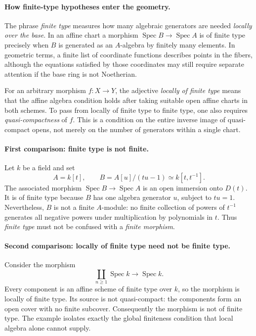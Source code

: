 \paragraph{How finite-type hypotheses enter the geometry.}
The phrase \emph{finite type} measures how many algebraic generators are needed
\emph{locally over the base}.  In an affine chart a morphism
\(\operatorname{Spec}B\to\operatorname{Spec}A\) is of finite type precisely when
\(B\) is generated as an \(A\)-algebra by finitely many elements.
In geometric terms, a finite list of coordinate functions describes points
in the fibers, although the equations satisfied by those coordinates may
still require separate attention if the base ring is not Noetherian.

For an arbitrary morphism \(f:X\to Y\), the adjective \emph{locally of finite
type} means that the affine algebra condition holds after taking suitable
open affine charts in both schemes.  To pass from locally of finite type to
finite type, one also requires \emph{quasi-compactness} of \(f\).
This is a condition on the entire inverse image of quasi-compact opens,
not merely on the number of generators within a single chart.

\paragraph{First comparison: finite type is not finite.}
Let \(k\) be a field and set
\[
 A=k[t],\qquad B=A[u]/(tu-1)\simeq k[t,t^{-1}].
\]
The associated morphism
\(\operatorname{Spec}B\to\operatorname{Spec}A\)
is an open immersion onto \(D(t)\).
It is of finite type because \(B\) has one algebra generator \(u\),
subject to \(tu=1\).  Nevertheless, \(B\) is not a finite \(A\)-module:
no finite collection of powers of \(t^{-1}\) generates all negative powers
under multiplication by polynomials in \(t\).
Thus \emph{finite type} must not be confused with a \emph{finite morphism}.

\paragraph{Second comparison: locally of finite type need not be finite type.}
Consider the morphism
\[
 \coprod_{n\geq 1}\operatorname{Spec}k
 \longrightarrow \operatorname{Spec}k.
\]
Every component is an affine scheme of finite type over \(k\), so the
morphism is locally of finite type.  Its source is not quasi-compact:
the components form an open cover with no finite subcover.
Consequently the morphism is not of finite type.  The example isolates
exactly the global finiteness condition that local algebra alone cannot
supply.

